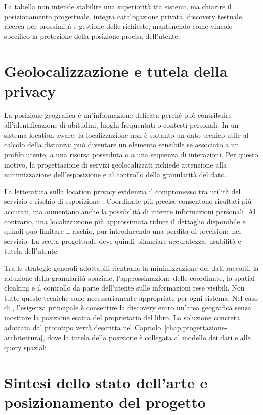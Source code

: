 La tabella non intende stabilire una superiorità tra sistemi, ma chiarire il posizionamento progettuale. \projectname{} integra catalogazione privata, discovery testuale, ricerca per prossimità e gestione delle richieste, mantenendo come vincolo specifico la protezione della posizione precisa dell'utente.

\section{Geolocalizzazione e tutela della privacy}
\label{sec:privacy-geolocalizzazione}

La posizione geografica è un'informazione delicata perché può contribuire all'identificazione di abitudini, luoghi frequentati o contesti personali. In un sistema location-aware, la localizzazione non è soltanto un dato tecnico utile al calcolo della distanza: può diventare un elemento sensibile se associato a un profilo utente, a una risorsa posseduta o a una sequenza di interazioni. Per questo motivo, la progettazione di servizi geolocalizzati richiede attenzione alla minimizzazione dell'esposizione e al controllo della granularità del dato.

La letteratura sulla location privacy evidenzia il compromesso tra utilità del servizio e rischio di esposizione \cite{jiang2021locationprivacy,rasheed2024locationqueryprivacy,oktay2024locationprivacy}. Coordinate più precise consentono risultati più accurati, ma aumentano anche la possibilità di inferire informazioni personali. Al contrario, una localizzazione più approssimata riduce il dettaglio disponibile e quindi può limitare il rischio, pur introducendo una perdita di precisione nel servizio. La scelta progettuale deve quindi bilanciare accuratezza, usabilità e tutela dell'utente.

Tra le strategie generali adottabili rientrano la minimizzazione dei dati raccolti, la riduzione della granularità spaziale, l'approssimazione delle coordinate, lo spatial cloaking e il controllo da parte dell'utente sulle informazioni rese visibili. Non tutte queste tecniche sono necessariamente appropriate per ogni sistema. Nel caso di \projectname{}, l'esigenza principale è consentire la discovery entro un'area geografica senza mostrare la posizione esatta del proprietario del libro. La soluzione concreta adottata dal prototipo verrà descritta nel Capitolo~\ref{chap:progettazione-architettura}, dove la tutela della posizione è collegata al modello dei dati e alle query spaziali.

\section{Sintesi dello stato dell'arte e posizionamento del progetto}
\label{sec:posizionamento-culturando}

